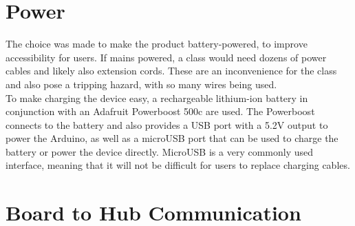 \section{Power}

The choice was made to make the product battery-powered, to improve accessibility for users. If mains powered, a class would need dozens of power cables and likely also extension cords. These are an inconvenience for the class and also pose a tripping hazard, with so many wires being used.\\

To make charging the device easy, a rechargeable lithium-ion battery in conjunction with an Adafruit Powerboost 500c \cite{PowerBoo78:online} are used. The Powerboost connects to the battery and also provides a USB port with a 5.2V output to power the Arduino, as well as a microUSB port that can be used to charge the battery or power the device directly. MicroUSB  is a very commonly used interface, meaning that it will not be difficult for users to replace charging cables. 


    

\section{Board to Hub Communication}
\label{sec:hub_comms}

    
    
    
    
    